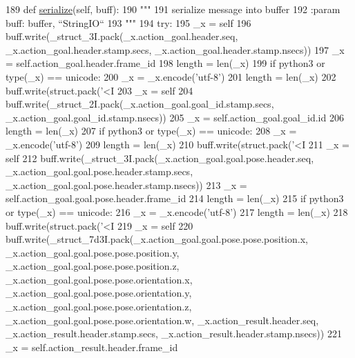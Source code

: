 \begin{DoxyCode}
189   \textcolor{keyword}{def }\hyperlink{classjaco__msgs_1_1msg_1_1__ArmPoseAction_1_1ArmPoseAction_ab667d2d96dc44cf52c0c01d92d201efa}{serialize}(self, buff):
190     \textcolor{stringliteral}{"""}
191 \textcolor{stringliteral}{    serialize message into buffer}
192 \textcolor{stringliteral}{    :param buff: buffer, ``StringIO``}
193 \textcolor{stringliteral}{    """}
194     \textcolor{keywordflow}{try}:
195       \_x = self
196       buff.write(\_struct\_3I.pack(\_x.action\_goal.header.seq, \_x.action\_goal.header.stamp.secs, 
      \_x.action\_goal.header.stamp.nsecs))
197       \_x = self.action\_goal.header.frame\_id
198       length = len(\_x)
199       \textcolor{keywordflow}{if} python3 \textcolor{keywordflow}{or} type(\_x) == unicode:
200         \_x = \_x.encode(\textcolor{stringliteral}{'utf-8'})
201         length = len(\_x)
202       buff.write(struct.pack(\textcolor{stringliteral}{'<I%
203       \_x = self
204       buff.write(\_struct\_2I.pack(\_x.action\_goal.goal\_id.stamp.secs, \_x.action\_goal.goal\_id.stamp.nsecs))
205       \_x = self.action\_goal.goal\_id.id
206       length = len(\_x)
207       \textcolor{keywordflow}{if} python3 \textcolor{keywordflow}{or} type(\_x) == unicode:
208         \_x = \_x.encode(\textcolor{stringliteral}{'utf-8'})
209         length = len(\_x)
210       buff.write(struct.pack(\textcolor{stringliteral}{'<I%
211       \_x = self
212       buff.write(\_struct\_3I.pack(\_x.action\_goal.goal.pose.header.seq, 
      \_x.action\_goal.goal.pose.header.stamp.secs, \_x.action\_goal.goal.pose.header.stamp.nsecs))
213       \_x = self.action\_goal.goal.pose.header.frame\_id
214       length = len(\_x)
215       \textcolor{keywordflow}{if} python3 \textcolor{keywordflow}{or} type(\_x) == unicode:
216         \_x = \_x.encode(\textcolor{stringliteral}{'utf-8'})
217         length = len(\_x)
218       buff.write(struct.pack(\textcolor{stringliteral}{'<I%
219       \_x = self
220       buff.write(\_struct\_7d3I.pack(\_x.action\_goal.goal.pose.pose.position.x, 
      \_x.action\_goal.goal.pose.pose.position.y, \_x.action\_goal.goal.pose.pose.position.z, \_x.action\_goal.goal.pose.pose.orientation.x, 
      \_x.action\_goal.goal.pose.pose.orientation.y, \_x.action\_goal.goal.pose.pose.orientation.z, 
      \_x.action\_goal.goal.pose.pose.orientation.w, \_x.action\_result.header.seq, \_x.action\_result.header.stamp.secs, 
      \_x.action\_result.header.stamp.nsecs))
221       \_x = self.action\_result.header.frame\_id
}}}
\end{DoxyCode}
